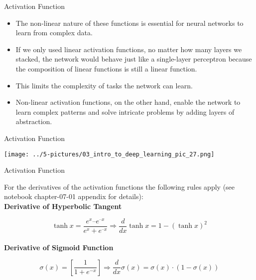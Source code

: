 \documentclass[11pt]{beamer}
\begin{document}
\begin{frame}{Activation Function}
\begin{itemize}
\item The non-linear nature of these functions is essential for neural networks to learn from complex data. 

\item If we only used linear activation functions, no matter how many layers we stacked, the network would behave just like a single-layer perceptron because the composition of linear functions is still a linear function. 

\item This limits the complexity of tasks the network can learn. 

\item Non-linear activation functions, on the other hand, enable the network to learn complex patterns and solve intricate problems by adding layers of abstraction.
\end{itemize}
\end{frame}
\begin{frame}{Activation Function}
	\begin{center}
	\texttt{[image: ../5-pictures/03\_intro\_to\_deep\_learning\_pic\_27.png]}
	\end{center}
\end{frame}
\begin{frame}{Activation Function}

For the derivatives of the activation functions the following rules apply (see notebook chapter-07-01 appendix for details):\\

\textbf{Derivative of Hyperbolic Tangent}

\begin{equation}
\tanh x = \frac{{{e^x} – {e^{ – x}}}}{{{e^x} + {e^{ – x}}}} 
\Rightarrow 
\frac{d}{{dx}}\tanh x =  1 - {\left(\tanh x \right)}^2 
\end{equation}\\

\textbf{Derivative of Sigmoid Function} 

\begin{equation}
\sigma(x) =  \left[ \dfrac{1}{1 + e^{-x}} \right]  \Rightarrow
\dfrac{d}{dx} \sigma(x) =  \sigma(x) \cdot (1 - \sigma(x))
\end{equation}

\end{frame}
%
\end{document}
